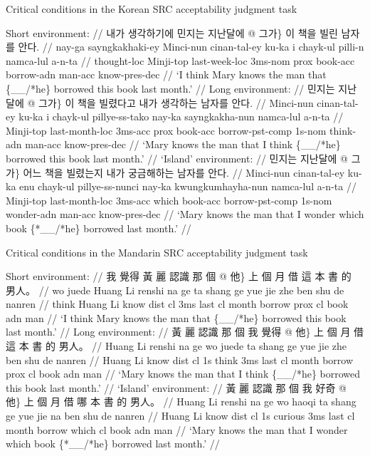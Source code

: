 \pex[everygla=\ko]
Critical conditions in the Korean SRC acceptability judgment task \label{ex-ajt-ko-src}\par\nobreak
\a 
\begingl
\glpreamble Short environment: //
\gla 내가 생각하기에 민지는 지난달에 \nogloss{\{\_\_/*} @ 그가\} 이 책을 빌린 남자를 안다. // 
\glb nay-ga sayngkakhaki-ey Minci-nun cinan-tal-ey ku-ka i chayk-ul pilli-n namca-lul a-n-ta //
 thought-{\sc loc} Minji-{\sc top} last-week-{\sc loc} {\sc 3ms-nom} {\sc prox} book-{\sc acc} borrow-{\sc adn} man-{\sc acc} know-{\sc pres-dec} //
\glft `I think Mary knows the man that \{\_\_/*he\} borrowed this book last month.' // 
\endgl 
\a 
\begingl
\glpreamble Long environment: //
\gla 민지는 지난달에 \nogloss{\{\_\_/*} @ 그가\} 이 책을 빌렸다고 내가 생각하는 남자를 안다. // 
\glb Minci-nun cinan-tal-ey ku-ka i chayk-ul pillye-ss-tako nay-ka sayngkakha-nun namca-lul a-n-ta //
\glc Minji-{\sc top} last-month-{\sc loc} {\sc 3ms-acc} {\sc prox} book-{\sc acc} borrow-{\sc pst-comp} {\sc 1s-nom} think-{\sc adn} man-{\sc acc} know-{\sc pres-dec} //
\glft `Mary knows the man that I think \{\_\_/*he\} borrowed this book last month.' // 
\endgl 
\a 
\begingl
\glpreamble `Island' environment: //
\gla 민지는 지난달에 \nogloss{\{\_\_/*} @ 그가\} 어느 책을 빌렸는지 내가 궁금해하는 남자를 안다. // 
\glb Minci-nun cinan-tal-ey ku-ka enu chayk-ul pillye-ss-nunci nay-ka kwungkumhayha-nun namca-lul a-n-ta //
\glc Minji-{\sc top} last-month-{\sc loc} {\sc 3ms-acc} which book-{\sc acc} borrow-{\sc pst-comp} {\sc 1s-nom} wonder-{\sc adn} man-{\sc acc} know-{\sc pres-dec} //
\glft `Mary knows the man that I wonder which book \{*\_\_/*he\} borrowed last month.' //
\endgl 
\xe

\pex[everygla=\zh]
Critical conditions in the Mandarin SRC acceptability judgment task \label{ex-ajt-zh-src}\par\nobreak
\a 
\begingl
\glpreamble Short environment: //
\gla 我 覺得 黃 麗 認識 那 個 \nogloss{\{\_\_/*} @ 他\} 上 個 月 借 這 本 書 的 男人。 // 
\glb wo juede Huang Li renshi na ge ta shang ge yue jie zhe ben shu de nanren //
 think Huang Li know {\sc dist} {\sc cl} {\sc 3ms} last {\sc cl} month borrow {\sc prox} {\sc cl} book {\sc adn} man //
\glft `I think Mary knows the man that \{\_\_/*he\} borrowed this book last month.' // 
\endgl 
\a 
\begingl
\glpreamble Long environment: //
\gla 黃 麗 認識 那 個 我 覺得 \nogloss{\{\_\_/} @ 他\} 上 個 月 借 這 本 書 的 男人。 // 
\glb Huang Li renshi na ge wo juede ta shang ge yue jie zhe ben shu de nanren //
\glc Huang Li know {\sc dist} {\sc cl} {\sc 1s} think {\sc 3ms} last {\sc cl} month borrow {\sc prox} {\sc cl} book {\sc adn} man //
\glft `Mary knows the man that I think \{\_\_/*he\} borrowed this book last month.' // 
\endgl 
\a 
\begingl
\glpreamble `Island' environment: //
\gla 黃 麗 認識 那 個 我 好奇 \nogloss{\{\_\_/} @ 他\} 上 個 月 借 哪 本 書 的 男人。 // 
\glb Huang Li renshi na ge wo haoqi ta shang ge yue jie na ben shu de nanren //
\glc Huang Li know {\sc dist} {\sc cl} {\sc 1s} curious {\sc 3ms} last {\sc cl} month borrow which {\sc cl} book {\sc adn} man //
\glft `Mary knows the man that I wonder which book \{*\_\_/*he\} borrowed last month.' //
\endgl 
\xe

